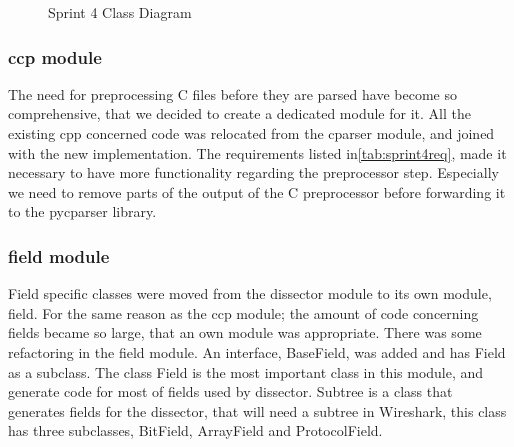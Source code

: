 \begin{figure}[htbp]
	\noindent{}
	\caption{Sprint 4 Class Diagram \label{fig:sp4class}}
\end{figure}

\subsubsection{ccp module}
The need for preprocessing C files before they are parsed have become so comprehensive, that we decided to create a dedicated module for it. All the existing cpp concerned code was relocated from the cparser module, and joined with the new implementation. The requirements listed in\autoref{tab:sprint4req}, made it necessary to have more functionality regarding the preprocessor step. Especially we need to remove parts of the output of the C preprocessor before forwarding it to the \gls{pycparser} library.

\subsubsection{field module}
Field specific classes were moved from the dissector module to its own module, field. For the same reason as the ccp module; the amount of code concerning fields became so large, that an own module was appropriate. There was some refactoring in the field module. An interface, BaseField, was added and has Field as a subclass. The class Field is the most important class in this module, and generate code for most of fields used by dissector. Subtree is a class that generates fields for the dissector, that will need a subtree in Wireshark, this class has three subclasses, BitField, ArrayField and ProtocolField.

